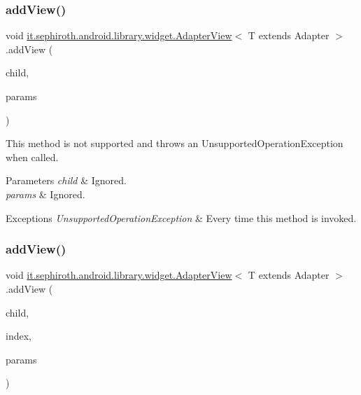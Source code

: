 \subsubsection{\texorpdfstring{add\+View()}{addView()}\hspace{0.1cm}{\footnotesize\ttfamily [3/4]}}
{\footnotesize\ttfamily void \hyperlink{classit_1_1sephiroth_1_1android_1_1library_1_1widget_1_1_adapter_view}{it.\+sephiroth.\+android.\+library.\+widget.\+Adapter\+View}$<$ T extends Adapter $>$.add\+View (\begin{DoxyParamCaption}\item[{View}]{child,  }\item[{Layout\+Params}]{params }\end{DoxyParamCaption})}

This method is not supported and throws an Unsupported\+Operation\+Exception when called.


\begin{DoxyParams}{Parameters}
{\em child} & Ignored. \\
\hline
{\em params} & Ignored.\\
\hline
\end{DoxyParams}

\begin{DoxyExceptions}{Exceptions}
{\em Unsupported\+Operation\+Exception} & Every time this method is invoked. \\
\hline
\end{DoxyExceptions}
\mbox{\label{classit_1_1sephiroth_1_1android_1_1library_1_1widget_1_1_adapter_view_a81a917d0f9d84e2d1efa5ff1029c1d36}} 
\subsubsection{\texorpdfstring{add\+View()}{addView()}\hspace{0.1cm}{\footnotesize\ttfamily [4/4]}}
{\footnotesize\ttfamily void \hyperlink{classit_1_1sephiroth_1_1android_1_1library_1_1widget_1_1_adapter_view}{it.\+sephiroth.\+android.\+library.\+widget.\+Adapter\+View}$<$ T extends Adapter $>$.add\+View (\begin{DoxyParamCaption}\item[{View}]{child,  }\item[{int}]{index,  }\item[{Layout\+Params}]{params }\end{DoxyParamCaption})}

